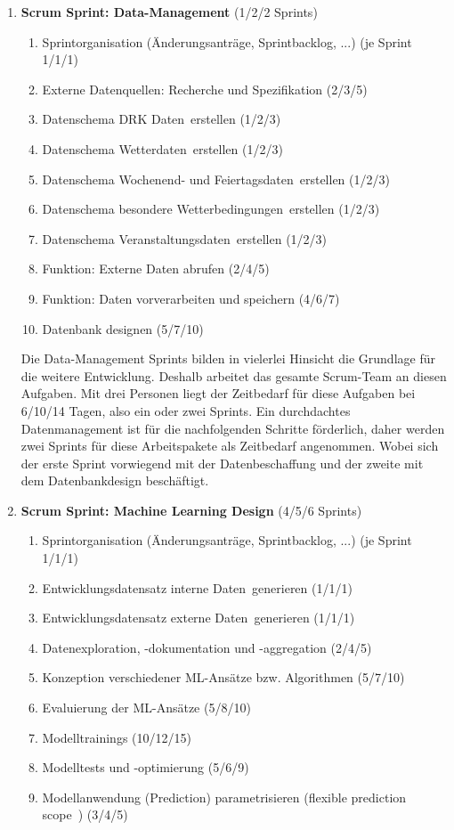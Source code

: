 \begin{enumerate}
	\item \textbf{Scrum Sprint: Data-Management} (1/2/2 Sprints)
	\begin{enumerate}
		\item Sprintorganisation (Änderungsanträge, Sprintbacklog, ...) (je Sprint 1/1/1)
		\item Externe Datenquellen: Recherche und Spezifikation (2/3/5)
		\item Datenschema \glqq DRK Daten\grqq\ erstellen (1/2/3)
		\item Datenschema \glqq Wetterdaten\grqq\ erstellen (1/2/3)
		\item Datenschema \glqq Wochenend- und Feiertagsdaten\grqq\ erstellen (1/2/3)
		\item Datenschema \glqq besondere Wetterbedingungen\grqq\ erstellen (1/2/3)
		\item Datenschema \glqq Veranstaltungsdaten\grqq\ erstellen (1/2/3)
		\item Funktion: Externe Daten abrufen (2/4/5)
		\item Funktion: Daten vorverarbeiten und speichern (4/6/7)
		\item Datenbank designen (5/7/10)
	\end{enumerate}
	
	Die Data-Management Sprints bilden in vielerlei Hinsicht die Grundlage für die weitere Entwicklung. Deshalb arbeitet das gesamte Scrum-Team an diesen Aufgaben. Mit drei Personen liegt der Zeitbedarf für diese Aufgaben bei 6/10/14 Tagen, also ein oder zwei Sprints. Ein durchdachtes Datenmanagement ist für die nachfolgenden Schritte förderlich, daher werden zwei Sprints für diese Arbeitspakete als Zeitbedarf angenommen. Wobei sich der erste Sprint vorwiegend mit der Datenbeschaffung und der zweite mit dem Datenbankdesign beschäftigt.
	
	\item \textbf{Scrum Sprint: Machine Learning Design} (4/5/6 Sprints)
	\begin{enumerate}
		\item Sprintorganisation (Änderungsanträge, Sprintbacklog, ...) (je Sprint 1/1/1)
		\item Entwicklungsdatensatz \glqq interne Daten\grqq\ generieren (1/1/1)
		\item Entwicklungsdatensatz \glqq externe Daten\grqq\ generieren (1/1/1)
		\item Datenexploration, -dokumentation und -aggregation (2/4/5)
		\item Konzeption verschiedener ML-Ansätze bzw. Algorithmen (5/7/10)
		\item Evaluierung der ML-Ansätze (5/8/10)
		\item Modelltrainings (10/12/15)
		\item Modelltests und -optimierung (5/6/9)
		\item Modellanwendung (Prediction) parametrisieren (\glqq flexible prediction scope\grqq\ ) (3/4/5)
	\end{enumerate}
	

\end{enumerate}
